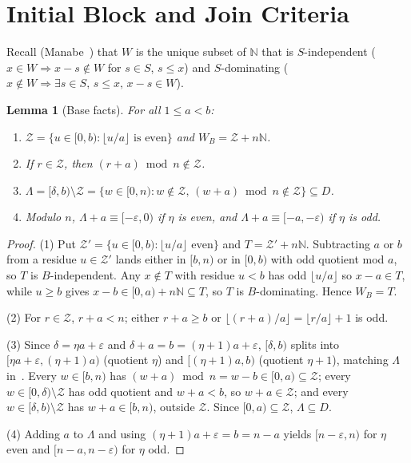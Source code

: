\documentclass[11pt]{article}
\newtheorem{lemma}[theorem]{Lemma}
\theoremstyle{remark}
\begin{document}
\section{Initial Block and Join Criteria}

Recall (Manabe~\cite[Lemma~4]{Manabe2026}) that $W$ is the unique subset of $\mathbb{N}$ that is $S$-independent ($x \in W \Rightarrow x - s \notin W$ for $s \in S$, $s \le x$) and $S$-dominating ($x \notin W \Rightarrow \exists s \in S,\, s \le x,\, x - s \in W$).

\begin{lemma}[Base facts]\label{lem:base}
For all $1 \le a < b$:
\begin{enumerate}
\item $\mathcal{Z} = \{u \in [0, b) : \lfloor u/a \rfloor \text{ is even}\}$ and $W_B = \mathcal{Z} + n\mathbb{N}$.
\item If $r \in \mathcal{Z}$, then $(r + a) \bmod n \notin \mathcal{Z}$.
\item $\Lambda = [\delta, b) \setminus \mathcal{Z} = \{w \in [0, n) : w \notin \mathcal{Z},\, (w + a) \bmod n \notin \mathcal{Z}\} \subseteq D$.
\item Modulo $n$, $\Lambda + a \equiv [-\varepsilon, 0)$ if $\eta$ is even, and $\Lambda + a \equiv [-a, -\varepsilon)$ if $\eta$ is odd.
\end{enumerate}
\end{lemma}

\begin{proof}
(1) Put $\mathcal{Z}' = \{u \in [0, b) : \lfloor u/a \rfloor \text{ even}\}$ and $T = \mathcal{Z}' + n\mathbb{N}$. Subtracting $a$ or $b$ from a residue $u \in \mathcal{Z}'$ lands either in $[b, n)$ or in $[0, b)$ with odd quotient mod $a$, so $T$ is $B$-independent. Any $x \notin T$ with residue $u < b$ has odd $\lfloor u/a \rfloor$ so $x - a \in T$, while $u \ge b$ gives $x - b \in [0, a) + n\mathbb{N} \subseteq T$, so $T$ is $B$-dominating. Hence $W_B = T$.

(2) For $r \in \mathcal{Z}$, $r + a < n$; either $r + a \ge b$ or $\lfloor (r+a)/a \rfloor = \lfloor r/a \rfloor + 1$ is odd.

(3) Since $\delta = \eta a + \varepsilon$ and $\delta + a = b = (\eta + 1)a + \varepsilon$, $[\delta, b)$ splits into $[\eta a + \varepsilon, (\eta+1)a)$ (quotient $\eta$) and $[(\eta+1)a, b)$ (quotient $\eta+1$), matching $\Lambda$ in~\cite[(4)]{Manabe2026}. Every $w \in [b, n)$ has $(w+a) \bmod n = w - b \in [0, a) \subseteq \mathcal{Z}$; every $w \in [0, \delta) \setminus \mathcal{Z}$ has odd quotient and $w + a < b$, so $w + a \in \mathcal{Z}$; and every $w \in [\delta, b) \setminus \mathcal{Z}$ has $w + a \in [b, n)$, outside $\mathcal{Z}$. Since $[0, a) \subseteq \mathcal{Z}$, $\Lambda \subseteq D$.

(4) Adding $a$ to $\Lambda$ and using $(\eta+1)a + \varepsilon = b = n - a$ yields $[n - \varepsilon, n)$ for $\eta$ even and $[n - a, n - \varepsilon)$ for $\eta$ odd.
\end{proof}
\end{document}
